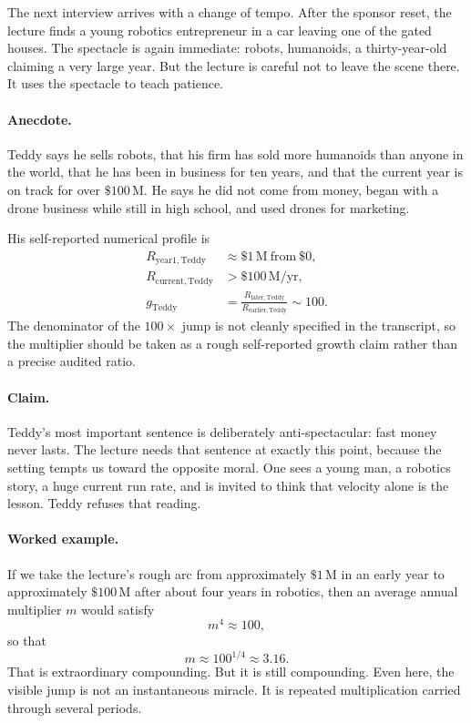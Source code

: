 The next interview arrives with a change of tempo. After the sponsor reset, the lecture finds a young robotics entrepreneur in a car leaving one of the gated houses. The spectacle is again immediate: robots, humanoids, a thirty-year-old claiming a very large year. But the lecture is careful not to leave the scene there. It uses the spectacle to teach patience.

\paragraph{Anecdote.}
Teddy says he sells robots, that his firm has sold more humanoids than anyone in the world, that he has been in business for ten years, and that the current year is on track for over \(\$100\,\mathrm{M}\). He says he did not come from money, began with a drone business while still in high school, and used drones for marketing.

His self-reported numerical profile is
\begin{align}
R_{\mathrm{year1,Teddy}} &\approx \$1\,\mathrm{M}\ \text{from}\ \$0,\\
R_{\mathrm{current,Teddy}} &> \$100\,\mathrm{M/yr},\\
g_{\mathrm{Teddy}} &= \frac{R_{\mathrm{later,Teddy}}}{R_{\mathrm{earlier,Teddy}}} \sim 100.
\end{align}
The denominator of the \(100\times\) jump is not cleanly specified in the transcript, so the multiplier should be taken as a rough self-reported growth claim rather than a precise audited ratio.

\paragraph{Claim.}
Teddy's most important sentence is deliberately anti-spectacular: fast money never lasts. The lecture needs that sentence at exactly this point, because the setting tempts us toward the opposite moral. One sees a young man, a robotics story, a huge current run rate, and is invited to think that velocity alone is the lesson. Teddy refuses that reading.

\paragraph{Worked example.}
If we take the lecture's rough arc from approximately \(\$1\,\mathrm{M}\) in an early year to approximately \(\$100\,\mathrm{M}\) after about four years in robotics, then an average annual multiplier \(m\) would satisfy
\begin{equation}
m^4 \approx 100,
\end{equation}
so that
\begin{equation}
m \approx 100^{1/4} \approx 3.16.
\end{equation}
That is extraordinary compounding. But it is still compounding. Even here, the visible jump is not an instantaneous miracle. It is repeated multiplication carried through several periods.

